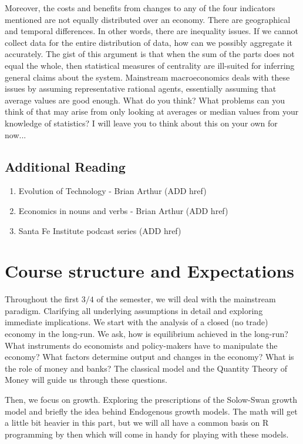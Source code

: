 \documentclass[10pt]{article}
\begin{document}
Moreover, the costs and benefits from changes to any of the four indicators mentioned are not equally distributed over an economy. There are geographical and temporal differences. In other words, there are inequality issues. If we cannot collect data for the entire distribution of data, how can we possibly aggregate it accurately. The gist of this argument is that when the sum of the parts does not equal the whole, then statistical measures of centrality are ill-suited for inferring general claims about the system. Mainstream macroeconomics deals with these issues by assuming representative rational agents, essentially assuming that average values are good enough. What do you think? What problems can you think of that may arise from only looking at averages or median values from your knowledge of statistics? I will leave you to think about this on your own for now...

\subsection*{Additional Reading}
\begin{enumerate}
  \item Evolution of Technology - Brian Arthur (ADD href)
  \item Economics in nouns and verbs - Brian Arthur (ADD href)
  \item Santa Fe Institute podcast series (ADD href)
\end{enumerate}

\section*{Course structure and Expectations}
Throughout the first $3 / 4$ of the semester, we will deal with the mainstream paradigm. Clarifying all underlying assumptions in detail and exploring immediate implications. We start with the analysis of a closed (no trade) economy in the long-run. We ask, how is equilibrium achieved in the long-run? What instruments do economists and policy-makers have to manipulate the economy? What factors determine output and changes in the economy? What is the role of money and banks? The classical model and the Quantity Theory of Money will guide us through these questions.

Then, we focus on growth. Exploring the prescriptions of the Solow-Swan growth model and briefly the idea behind Endogenous growth models. The math will get a little bit heavier in this part, but we will all have a common basis on R programming by then which will come in handy for playing with these models.
\end{document}
